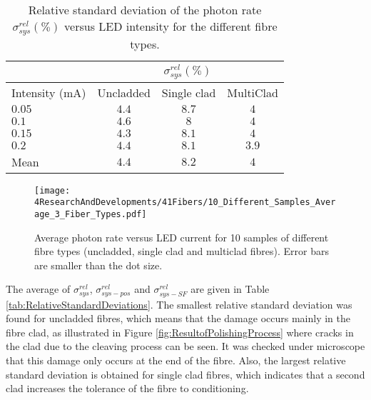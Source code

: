 \begin{table}[h]
\centering{}%
\begin{tabular}{lccc}
\toprule 
 & \multicolumn{3}{c}{$\sigma^{rel}_{sys}(\%)$} \tabularnewline
\midrule
Intensity (mA) & Uncladded & Single clad & MultiClad \tabularnewline
\midrule
\midrule
$0.05$ & $4.4$ & $8.7$ & $4$ \tabularnewline
$0.1$ & $4.6$ & $8$ & $4$ \tabularnewline
$0.15$ & $4.3$ & $8.1$ & $4$ \tabularnewline
$0.2$ & $4.4$ & $8.1$ & $3.9$ \tabularnewline
\midrule 
Mean & $4.4$ & $8.2$ & $4$ \tabularnewline
\bottomrule
\end{tabular}
\caption{Relative standard deviation of the photon rate $\sigma^{rel}_{sys}(\%)$ versus LED intensity for the different fibre types.}
\label{tab:RelativeStandardDeviation3FiberTypes}
\end{table}

\begin{figure}[h]
\centering
\texttt{[image: 4ResearchAndDevelopments/41Fibers/10\_Different\_Samples\_Average\_3\_Fiber\_Types.pdf]}
\caption{Average photon rate versus LED current for 10 samples of different fibre types (uncladded, single clad and multiclad fibres). Error bars are smaller than the dot size.\label{fig:AveregeThreeFiberTypes}}
\end{figure}



The average of $\sigma^{rel}_{sys}$, $\sigma^{rel}_{sys-pos}$ and $\sigma^{rel}_{sys-SF}$ are given in Table \ref{tab:RelativeStandardDeviations}. The smallest relative standard deviation was found for uncladded fibres, which means that the damage occurs mainly in the fibre clad, as illustrated in Figure \ref{fig:ResultofPolishingProcess} where cracks in the clad due to the cleaving process can be seen. It was checked under microscope that this damage only occurs at the end of the fibre. Also, the largest relative standard deviation is obtained for single clad fibres, which indicates that a second clad increases the tolerance of the fibre to conditioning.

